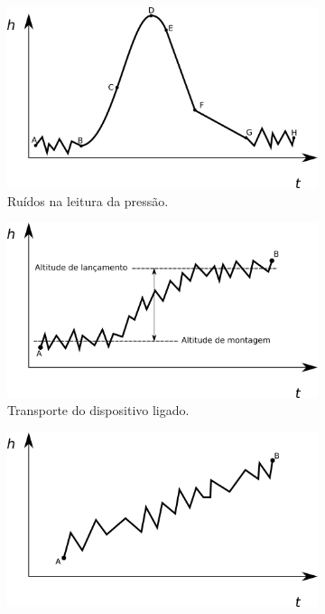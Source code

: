 \documentclass[12pt,a4paper]{article}
\begin{document}
\begin{figure}[!ht]
	\centering
	\begin{subfigure}{0.48\textwidth}
		\includegraphics[width=\textwidth]{./fig/trajectoryB}
		\caption{Ruídos na leitura da pressão.}
		\label{fig:adverseA}
	\end{subfigure}
	\begin{subfigure}{0.48\textwidth}
	\includegraphics[width=\textwidth]{./fig/trajectoryE}
	\caption{Transporte do dispositivo ligado.}
	\label{fig:adverseE}
	\end{subfigure}
	\begin{subfigure}{0.48\textwidth}
	\includegraphics[width=\textwidth]{./fig/trajectoryD}

\end{subfigure}
\end{figure}
\end{document}
